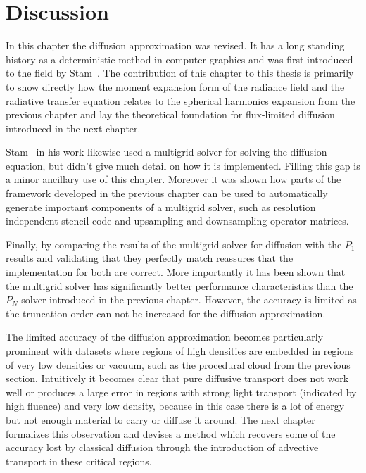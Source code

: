 \section{Discussion}
\label{sec:da_discussion}

In this chapter the diffusion approximation was revised. It has a long standing history as a deterministic method in computer graphics and was first introduced to the field by Stam~\cite{Stam95}. The contribution of this chapter to this thesis is primarily to show directly how the moment expansion form of the radiance field and the radiative transfer equation relates to the spherical harmonics expansion from the previous chapter and lay the theoretical foundation for flux-limited diffusion introduced in the next chapter.

Stam~\cite{Stam95} in his work likewise used a multigrid solver for solving the diffusion equation, but didn't give much detail on how it is implemented. Filling this gap is a minor ancillary use of this chapter. Moreover it was shown how parts of the framework developed in the previous chapter can be used to automatically generate important components of a multigrid solver, such as resolution independent stencil code and upsampling and downsampling operator matrices.

Finally, by comparing the results of the multigrid solver for diffusion with the $P_1$-results and validating that they perfectly match reassures that the implementation for both are correct. More importantly it has been shown that the multigrid solver has significantly better performance characteristics than the $P_N$-solver introduced in the previous chapter. However, the accuracy is limited as the truncation order can not be increased for the diffusion approximation.


The limited accuracy of the diffusion approximation becomes particularly prominent with datasets where regions of high densities are embedded in regions of very low densities or vacuum, such as the procedural cloud from the previous section. Intuitively it becomes clear that pure diffusive transport does not work well or produces a large error in regions with strong light transport (indicated by high fluence) and very low density, because in this case there is a lot of energy but not enough material to carry or diffuse it around. The next chapter formalizes this observation and devises a method which recovers some of the accuracy lost by classical diffusion through the introduction of advective transport in these critical regions.